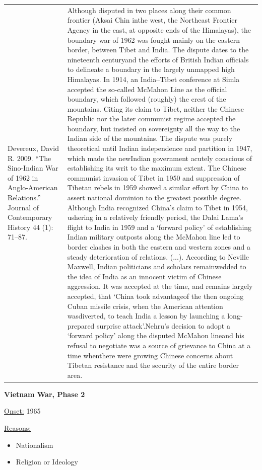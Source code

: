 {\begin{longtable}{p{}p{}}
Devereux, David R. 2009. “The Sino-Indian War of 1962 in Anglo-American Relations.” Journal of Contemporary History 44 (1): 71–87. & Although disputed in two places along their common frontier (Aksai Chin inthe west, the Northeast Frontier Agency in the east, at opposite ends of the Himalayas), the boundary war of 1962 was fought mainly on the eastern border, between Tibet and India. The dispute dates to the nineteenth centuryand the efforts of British Indian officials to delineate a boundary in the largely unmapped high Himalayas. In 1914, an India–Tibet conference at Simla accepted the so-called McMahon Line as the official boundary, which followed (roughly) the crest of the mountains. Citing its claim to Tibet, neither the Chinese Republic nor the later communist regime accepted the boundary, but insisted on sovereignty all the way to the Indian side of the mountains. The dispute was purely theoretical until Indian independence and partition in 1947, which made the newIndian government acutely conscious of establishing its writ to the maximum extent. The Chinese communist invasion of Tibet in 1950 and suppression of Tibetan rebels in 1959 showed a similar effort by China to assert national dominion to the greatest possible degree. Although India recognized China's claim to Tibet in 1954, ushering in a relatively friendly period, the Dalai Lama's flight to India in 1959 and a ‘forward policy' of establishing Indian military outposts along the McMahon line led to border clashes in both the eastern and western zones and a steady deterioration of relations. (...).  
According to Neville Maxwell, Indian politicians and scholars remainwedded to the idea of India as an innocent victim of Chinese aggression. It was accepted at the time, and remains largely accepted, that ‘China took advantageof the then ongoing Cuban missile crisis, when the American attention wasdiverted, to teach India a lesson by launching a long-prepared surprise attack'.Nehru's decision to adopt a ‘forward policy' along the disputed McMahon lineand his refusal to negotiate was a source of grievance to China at a time whenthere were growing Chinese concerns about Tibetan resistance and the security of the entire border area.
\\
\end{longtable}}
\clearpage
         \textbf{Vietnam War, Phase 2} 

          \underline{Onset:} 1965         

\underline{Reasons:}
\begin{itemize}
\item Nationalism
\item Religion or Ideology
\end{itemize}

